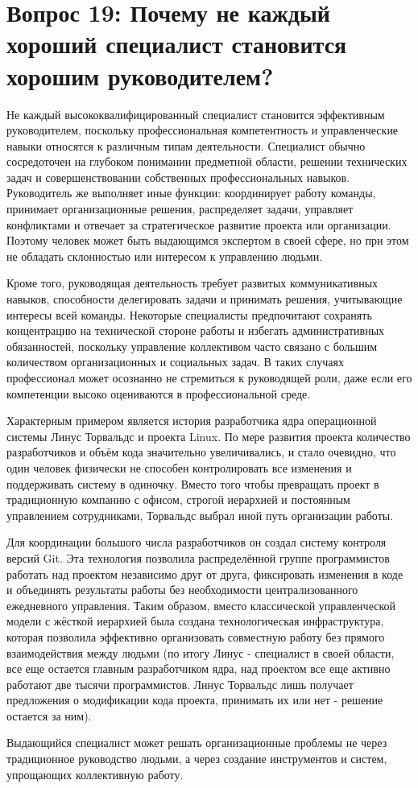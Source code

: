 \documentclass[14pt,a4paper]{extarticle}
\begin{document}
\newpage
\section{Вопрос 19: Почему не каждый хороший специалист становится хорошим руководителем?}

Не каждый высококвалифицированный специалист становится эффективным руководителем, поскольку профессиональная компетентность и управленческие навыки относятся к различным типам деятельности. Специалист обычно сосредоточен на глубоком понимании предметной области, решении технических задач и совершенствовании собственных профессиональных навыков. Руководитель же выполняет иные функции: координирует работу команды, принимает организационные решения, распределяет задачи, управляет конфликтами и отвечает за стратегическое развитие проекта или организации. Поэтому человек может быть выдающимся экспертом в своей сфере, но при этом не обладать склонностью или интересом к управлению людьми.

Кроме того, руководящая деятельность требует развитых коммуникативных навыков, способности делегировать задачи и принимать решения, учитывающие интересы всей команды. Некоторые специалисты предпочитают сохранять концентрацию на технической стороне работы и избегать административных обязанностей, поскольку управление коллективом часто связано с большим количеством организационных и социальных задач. В таких случаях профессионал может осознанно не стремиться к руководящей роли, даже если его компетенции высоко оцениваются в профессиональной среде.

Характерным примером является история разработчика ядра операционной системы Линус Торвальдс и проекта Linux. По мере развития проекта количество разработчиков и объём кода значительно увеличивались, и стало очевидно, что один человек физически не способен контролировать все изменения и поддерживать систему в одиночку. Вместо того чтобы превращать проект в традиционную компанию с офисом, строгой иерархией и постоянным управлением сотрудниками, Торвальдс выбрал иной путь организации работы.

Для координации большого числа разработчиков он создал систему контроля версий Git. Эта технология позволила распределённой группе программистов работать над проектом независимо друг от друга, фиксировать изменения в коде и объединять результаты работы без необходимости централизованного ежедневного управления. Таким образом, вместо классической управленческой модели с жёсткой иерархией была создана технологическая инфраструктура, которая позволила эффективно организовать совместную работу без прямого взаимодействия между людьми (по итогу Линус - специалист в своей области, все еще остается главным разработчиком ядра, над проектом все еще активно работают две тысячи программистов. Линус Торвальдс лишь получает предложения о модификации кода проекта, принимать их или нет - решение остается за ним).

Выдающийся специалист может решать организационные проблемы не через традиционное руководство людьми, а через создание инструментов и систем, упрощающих коллективную работу.
\end{document}
